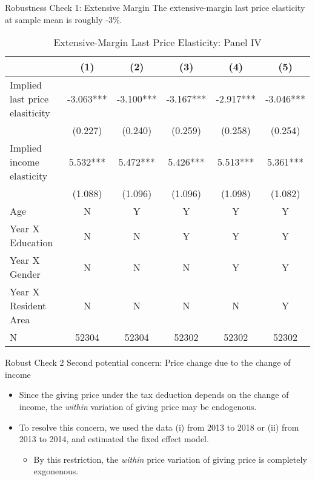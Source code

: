 \documentclass[
  ignorenonframetext,
]{beamer}
\providecommand{\tightlist}{%
  \setlength{\itemsep}{0pt}\setlength{\parskip}{0pt}}
\begin{document}
\begin{frame}{Robustness Check 1: Extensive Margin}
\protect\hypertarget{robustness-check-1-extensive-margin}{}
The extensive-margin last price elasticity at sample mean is roughly -3\%.

\begin{table}

\caption{\label{tab:kableLastElasticity2Slide2}Extensive-Margin Last Price Elasticity: Panel IV}
\centering
\fontsize{7}{9}\selectfont
\begin{tabular}[t]{lccccc}
\toprule
 & (1) & (2) & (3) & (4) & (5)\\
\midrule
Implied last price elasiticity & -3.063*** & -3.100*** & -3.167*** & -2.917*** & -3.046***\\
 & (0.227) & (0.240) & (0.259) & (0.258) & (0.254)\\
Implied income elasticity & 5.532*** & 5.472*** & 5.426*** & 5.513*** & 5.361***\\
 & (1.088) & (1.096) & (1.096) & (1.098) & (1.082)\\
Age & N & Y & Y & Y & Y\\
Year X Education & N & N & Y & Y & Y\\
Year X Gender & N & N & N & Y & Y\\
Year X Resident Area & N & N & N & N & Y\\
N & 52304 & 52304 & 52302 & 52302 & 52302\\
\bottomrule
\end{tabular}
\end{table}
\end{frame}

\begin{frame}{Robust Check 2}
\protect\hypertarget{robust-check-2}{}
Second potential concern: Price change due to the change of income

\begin{itemize}
\tightlist
\item
  Since the giving price under the tax deduction depends on the change of income, the \emph{within} variation of giving price may be endogenous.
\item
  To resolve this concern, we used the data (i) from 2013 to 2018 or (ii) from 2013 to 2014, and estimated the fixed effect model.

  \begin{itemize}
  \tightlist
  \item
    By this restriction, the \emph{within} price variation of giving price is completely exgonenous.
  \end{itemize}
\end{itemize}
\end{frame}
\end{document}

